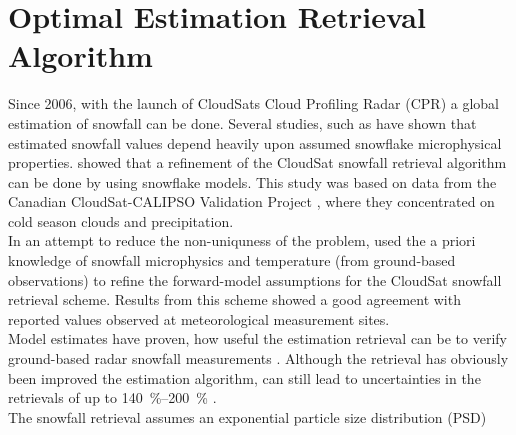 \section{Optimal Estimation Retrieval Algorithm} %
\label{sec:retrieval}
Since 2006, with the launch of CloudSats Cloud Profiling Radar (CPR) a global estimation of snowfall can be done. Several studies, such as \cite{kulie_utilizing_2009} have shown that estimated snowfall values depend heavily upon assumed snowflake microphysical properties.
\cite{wood_microphysical_2015} showed that a refinement of the CloudSat snowfall retrieval algorithm can be done by using snowflake models. 
This study was based on data from the Canadian CloudSat-CALIPSO Validation Project \citep[C3VP,][]{hudak_canadian_2006}, where they concentrated on cold season clouds and precipitation.
\\
\noindent In an attempt to reduce the non-uniquness of the problem, \cite{wood_microphysical_2015} used the a priori knowledge of snowfall microphysics and temperature (from ground-based observations) to refine the forward-model assumptions for the CloudSat snowfall retrieval scheme. 
Results from this scheme showed a good agreement with reported values observed at meteorological measurement sites. \\
Model estimates have proven, how useful the estimation retrieval can be to verify ground-based radar snowfall measurements \citep{norin_intercomparison_2015}.
Although the retrieval has obviously been improved the estimation algorithm, can still lead to uncertainties in the retrievals of up to \SIrange{140}{200}{\percent} \citep{wood_estimation_2011}. 
\\
\noindent The snowfall retrieval assumes an exponential particle size distribution (PSD)
